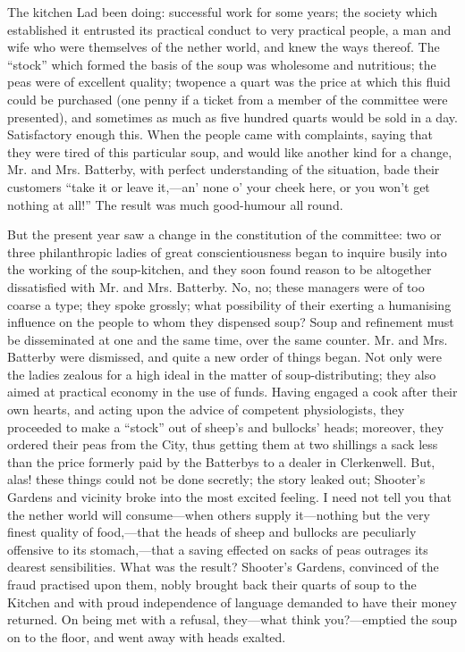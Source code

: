 The kitchen Lad been doing: successful work for some years; the society
which established it entrusted its practical conduct to very practical
people, a man and wife who were themselves of the nether world, and knew
the ways {\protect\hypertarget{9}{}{}}thereof. The ``stock'' which
formed the basis of the soup was wholesome and nutritious; the peas were
of excellent quality; twopence a quart was the price at which this fluid
could be purchased (one penny if a ticket from a member of the committee
were presented), and sometimes as much as five hundred quarts would be
sold in a day. Satisfactory enough this. When the people came with
complaints, saying that they were tired of this particular soup, and
would like another kind for a change, Mr. and Mrs. Batterby, with
perfect understanding of the situation, bade their customers ``take it
or leave it,---an' none o' your cheek here, or you won't get nothing at
all!'' The result was much good-humour all round.

But the present year saw a change in the constitution of the committee:
two or three philanthropic ladies of great conscientiousness began to
inquire busily into the working of the soup-kitchen, and they soon found
reason to be altogether dissatisfied with Mr. and Mrs. Batterby. No, no;
these managers were of too coarse a type; they spoke grossly; what
possibility of their exerting a humanising
{\protect\hypertarget{10}{}{}}influence on the people to whom they
dispensed soup? Soup and refinement must be disseminated at one and the
same time, over the same counter. Mr. and Mrs. Batterby were dismissed,
and quite a new order of things began. Not only were the ladies zealous
for a high ideal in the matter of soup-distributing; they also aimed at
practical economy in the use of funds. Having engaged a cook after their
own hearts, and acting upon the advice of competent physiologists, they
proceeded to make a ``stock'' out of sheep's and bullocks' heads;
moreover, they ordered their peas from the City, thus getting them at
two shillings a sack less than the price formerly paid by the Batterbys
to a dealer in Clerkenwell. But, alas! these things could not be done
secretly; the story leaked out; Shooter's Gardens and vicinity broke
into the most excited feeling. I need not tell you that the nether world
will consume---when others supply it---nothing but the very finest
quality of food,---that the heads of sheep and bullocks are peculiarly
offensive to its stomach,---that a saving effected on sacks of peas
outrages its dearest sensibilities. What was the result? Shooter's
Gardens, convinced {\protect\hypertarget{11}{}{}}of the fraud practised
upon them, nobly brought back their quarts of soup to the Kitchen and
with proud independence of language demanded to have their money
returned. On being met with a refusal, they---what think you?---emptied
the soup on to the floor, and went away with heads exalted.

